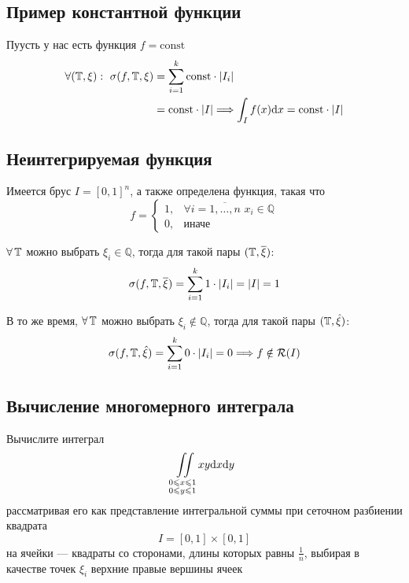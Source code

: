 \documentclass[a4paper, 10pt]{article}
\begin{document}
\subsection{Пример константной функции}
Пуусть у нас есть функция $f = \text{const}$
\begin{equation*}
\begin{aligned}
    \forall(\T, \xi):\ \sigma(f, \T, \xi)&= \sum_{i = 1}^k \text{const}\cdot|I_i|\\
    &= \text{const}\cdot|I| \Longrightarrow \int_I f(x)\d{x} = \text{const}\cdot|I|
    \end{aligned}
\end{equation*}

\subsection{Неинтегрируемая функция}
Имеется брус $I = [0, 1]^n$, а также определена функция, такая что
\begin{equation*}
    f = \begin{cases}
        1,& \forall i = \overline{1,\ldots, n}\,\, x_i\in \mathbb{Q}\\
        0,&\text{иначе}
    \end{cases}
\end{equation*}

\proof $\forall \operatorname{\mathbb{T}}$ можно выбрать $\xi_i\in \mathbb{Q}$, тогда для такой пары $(\operatorname{\mathbb{T}}, \overline{\xi})$:
\begin{equation*}
    \sigma(f, \T, \overline{\xi}) = \sum_{i=1}^k1\cdot|I_i| = |I| = 1
\end{equation*}

В то же время, $\forall \operatorname{\mathbb{T}}$ можно выбрать $\xi_i\notin \mathbb{Q}$, тогда для такой пары $(\operatorname{\mathbb{T}}, \hat{\xi})$:
\begin{equation*}
    \sigma(f, \T, \hat{\xi}) = \sum_{i=1}^k0\cdot|I_i| = 0 \Longrightarrow f\notin\mathcal{R}(I)
\end{equation*}

\subsection{Вычисление многомерного интеграла}
Вычислите интеграл
$$\iint\limits_{\substack{0\leqslant x\leqslant 1\\ 0\leqslant y\leqslant 1}}xy\text{d}x\text{d}y$$
рассматривая его как представление интегральной суммы при сеточном разбиении квадрата $$I = [0, 1]\times[0, 1]$$ на ячейки — квадраты со сторонами, длины которых равны $\frac{1}{n}$, выбирая в качестве точек $\xi_i$ верхние правые вершины ячеек
\end{document}
